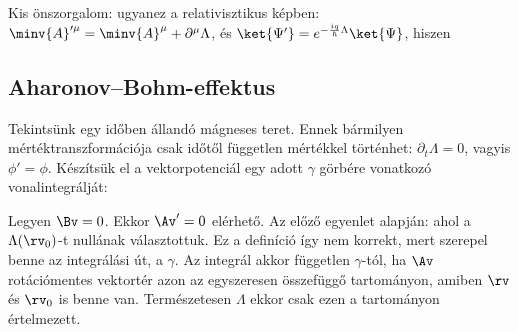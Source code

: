    Kis önszorgalom: ugyanez a relativisztikus képben: $\minv{A}'^\mu=\minv{A}^\mu+\partial^\mu \Lambda$, és $\ket{\Psi'}=e^{-\frac{iq}{\hbar}\Lambda}\ket{\Psi}$, hiszen
   
  \subsection{Aharonov--Bohm-effektus}
   
   Tekintsünk egy időben állandó mágneses teret.
   Ennek bármilyen mértéktranszformációja csak időtől független mértékkel történhet: $\partial_t\Lambda=0$, vagyis $\phi'=\phi$.
   Készítsük el a vektorpotenciál egy adott $\gamma$ görbére vonatkozó vonalintegrálját:
   
   Legyen $\Bv=0$.
   Ekkor $\Av'=0$ elérhető.
   Az előző egyenlet alapján:
   ahol a $\Lambda(\rv_0)$-t nullának választottuk.
   Ez a definíció így nem korrekt, mert szerepel benne az integrálási út, a $\gamma$.
   Az integrál akkor független $\gamma$-tól, ha $\Av$ rotációmentes vektortér azon az egyszeresen összefüggő tartományon, amiben $\rv$ és $\rv_0$ is benne van.
   Természetesen $\Lambda$ ekkor csak ezen a tartományon értelmezett. 
   
